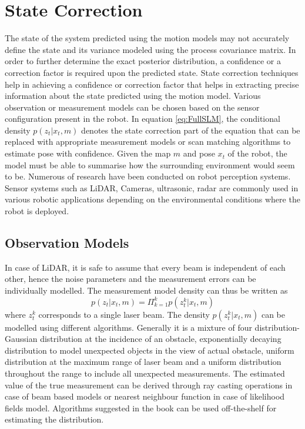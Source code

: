\section{State Correction}
The state of the system predicted using the motion models may not accurately define the state and its variance modeled using the process covariance matrix. In order to further determine the exact posterior distribution, a confidence or a correction factor is required upon the predicted state. State correction techniques help in achieving a confidence or correction factor that helps in extracting precise information about the state predicted using the motion model. Various observation or measurement models can be chosen based on the sensor configuration present in the robot. In equation \ref{eq:FullSLM}, the conditional density $p(z_t | x_t, m)$ denotes the state correction part of the equation that can be replaced with appropriate measurement models or scan matching algorithms to estimate pose with confidence. Given the map $m$ and pose $x_t$ of the robot, the model must be able to summarise how the surrounding environment would seem to be. Numerous of research have been conducted on robot perception systems. Sensor systems such as LiDAR, Cameras, ultrasonic, radar are commonly used in various robotic applications depending on the environmental conditions where the robot is deployed.

\subsection{Observation Models}
In case of LiDAR, it is safe to assume that every beam is independent of each other, hence the noise parameters and the measurement errors can be individually modelled. The measurement model density can thus be written as 
\begin{equation}
    p(z_t | x_t, m)  = \Pi_{k=1}^k  p(z_t^k | x_t, m)
\end{equation}
where  $z_t^k$ corresponds to a single laser beam. The density $p(z_t^k | x_t, m)$ can be modelled using different algorithms. Generally it is a mixture of four distribution- Gaussian distribution at the incidence of an obstacle, exponentially decaying distribution to model unexpected objects in the view of actual obstacle, uniform distribution at the maximum range of laser beam and a uniform distribution throughout the range to include all unexpected measurements. The estimated value of the true measurement can be derived through ray casting operations in case of beam based models or nearest neighbour function in case of likelihood fields model\cite{Thrun98aprobabilistic}.  Algorithms suggested in the book \cite{Thrun98aprobabilistic} can be used off-the-shelf for estimating the distribution.

